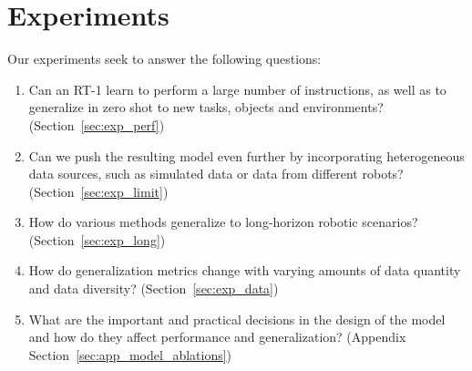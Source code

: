 \documentclass{article} %
\newcommand{\algname}{RT-1\xspace}
\begin{document}
\section{Experiments}\label{sec:exp}

Our experiments seek to answer the following questions: 
\begin{enumerate}[topsep=0pt,itemsep=-1ex,partopsep=1ex,parsep=1ex]
    \item Can an \algname learn to perform a large number of instructions, as well as to generalize in zero shot to new tasks, objects and environments? (Section~\ref{sec:exp_perf})
    \item Can we push the resulting model even further by incorporating heterogeneous data sources, such as simulated data or data from different robots?  (Section~\ref{sec:exp_limit})
    \item How do various methods generalize to long-horizon robotic scenarios? (Section~\ref{sec:exp_long})
    \item How do generalization metrics change with varying amounts of data quantity and data diversity? (Section~\ref{sec:exp_data})
    \item What are the important and practical decisions in the design of the model and how do they affect performance and generalization? (Appendix Section~\ref{sec:app_model_ablations})
\end{enumerate}
\end{document}
